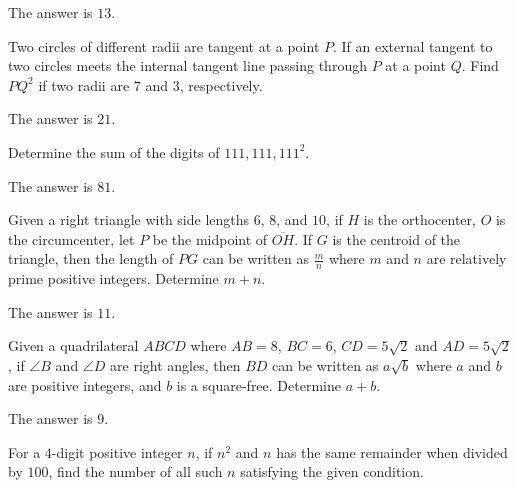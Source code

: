 \begin{solution}
The answer is $13$.
\end{solution}

\begin{problem}
Two circles of different radii are tangent at a point $P$. If an external tangent to two circles meets the internal tangent line passing through $P$ at a point $Q$. Find $PQ^2$ if two radii are $7$ and $3$, respectively.
\end{problem}

\begin{solution}
The answer is $21$.
\end{solution}

\begin{problem}
Determine the sum of the digits of $111,111,111^2$.
\end{problem}

\begin{solution}
The answer is $81$.
\end{solution}

\begin{problem}
Given a right triangle with side lengths $6$, $8$, and $10$, if $H$ is the orthocenter, $O$ is the circumcenter, let $P$ be the midpoint of $\overline{OH}$. If $G$ is the centroid of the triangle, then the length of $PG$ can be written as $\frac{m}{n}$ where $m$ and $n$ are relatively prime positive integers. Determine $m+n$.
\end{problem}

\begin{solution}
The answer is $11$.
\end{solution}

\begin{problem}
Given a quadrilateral $ABCD$ where $AB=8$, $BC=6$, $CD=5\sqrt{2}$ and $AD=5\sqrt{2}$, if $\angle B$ and $\angle D$ are right angles, then $BD$ can be written as $a\sqrt{b}$ where $a$ and $b$ are positive integers, and $b$ is a square-free. Determine $a+b$.
\end{problem}

\begin{solution}
The answer is $9$.
\end{solution}

\begin{problem}
For a $4$-digit positive integer $n$, if $n^2$ and $n$ has the same remainder when divided by $100$, find the number of all such $n$ satisfying the given condition.
\end{problem}

